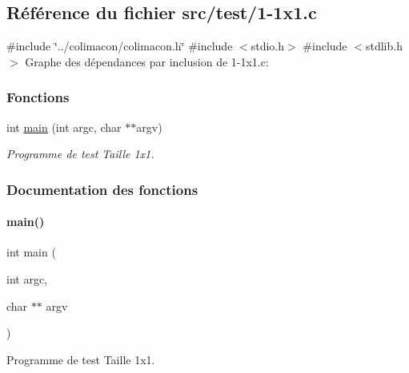 \hypertarget{1-1x1_8c}{}\subsection{Référence du fichier src/test/1-\/1x1.c}
\label{1-1x1_8c}
{\ttfamily \#include \char`\"{}../colimacon/colimacon.\+h\char`\"{}}\newline
{\ttfamily \#include $<$stdio.\+h$>$}\newline
{\ttfamily \#include $<$stdlib.\+h$>$}\newline
Graphe des dépendances par inclusion de 1-\/1x1.c\+:
\subsubsection*{Fonctions}
\begin{DoxyCompactItemize}
\item 
int \hyperlink{1-1x1_8c_a3c04138a5bfe5d72780bb7e82a18e627}{main} (int argc, char $\ast$$\ast$argv)
\begin{DoxyCompactList}\small\item\em Programme de test Taille 1x1. \end{DoxyCompactList}\end{DoxyCompactItemize}


\subsubsection{Documentation des fonctions}
\mbox{\label{1-1x1_8c_a3c04138a5bfe5d72780bb7e82a18e627}} 
\paragraph{\texorpdfstring{main()}{main()}}
{\footnotesize\ttfamily int main (\begin{DoxyParamCaption}\item[{int}]{argc,  }\item[{char $\ast$$\ast$}]{argv }\end{DoxyParamCaption})}



Programme de test Taille 1x1. 

